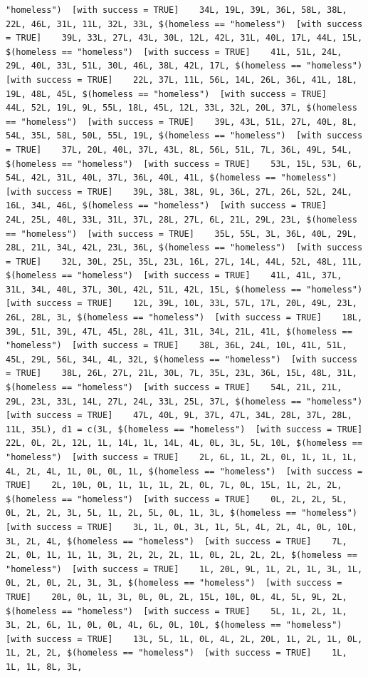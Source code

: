 \documentclass{tufte-book}\usepackage[]{graphicx}\usepackage[]{xcolor}
\makeatletter
\newenvironment{kframe}{%
 \def\at@end@of@kframe{}%
 \ifinner\ifhmode%
  \def\at@end@of@kframe{\end{minipage}}%
  \begin{minipage}{\columnwidth}%
 \fi\fi%
 \def\FrameCommand##1{\hskip\@totalleftmargin \hskip-\fboxsep
 \colorbox{shadecolor}{##1}\hskip-\fboxsep
     \hskip-\linewidth \hskip-\@totalleftmargin \hskip\columnwidth}%
 \MakeFramed {\advance\hsize-\width
   \@totalleftmargin\z@ \linewidth\hsize
   \@setminipage}}%
 {\par\unskip\endMakeFramed%
 \at@end@of@kframe}
\newenvironment{knitrout}{}{} %
\makeatother
\begin{document}
\begin{knitrout}
\begin{kframe}
\begin{verbatim}
"homeless")  [with success = TRUE]    34L, 19L, 39L, 36L, 58L, 38L, 22L, 46L, 31L, 11L, 32L, 33L, $(homeless == "homeless")  [with success = TRUE]    39L, 33L, 27L, 43L, 30L, 12L, 42L, 31L, 40L, 17L, 44L, 15L, $(homeless == "homeless")  [with success = TRUE]    41L, 51L, 24L, 29L, 40L, 33L, 51L, 30L, 46L, 38L, 42L, 17L, $(homeless == "homeless")  [with success = TRUE]    22L, 37L, 11L, 56L, 14L, 26L, 36L, 41L, 18L, 19L, 48L, 45L, $(homeless == "homeless")  [with success = TRUE]    44L, 52L, 19L, 9L, 55L, 18L, 45L, 12L, 33L, 32L, 20L, 37L, $(homeless == "homeless")  [with success = TRUE]    39L, 43L, 51L, 27L, 40L, 8L, 54L, 35L, 58L, 50L, 55L, 19L, $(homeless == "homeless")  [with success = TRUE]    37L, 20L, 40L, 37L, 43L, 8L, 56L, 51L, 7L, 36L, 49L, 54L, $(homeless == "homeless")  [with success = TRUE]    53L, 15L, 53L, 6L, 54L, 42L, 31L, 40L, 37L, 36L, 40L, 41L, $(homeless == "homeless")  [with success = TRUE]    39L, 38L, 38L, 9L, 36L, 27L, 26L, 52L, 24L, 16L, 34L, 46L, $(homeless == "homeless")  [with success = TRUE]    24L, 25L, 40L, 33L, 31L, 37L, 28L, 27L, 6L, 21L, 29L, 23L, $(homeless == "homeless")  [with success = TRUE]    35L, 55L, 3L, 36L, 40L, 29L, 28L, 21L, 34L, 42L, 23L, 36L, $(homeless == "homeless")  [with success = TRUE]    32L, 30L, 25L, 35L, 23L, 16L, 27L, 14L, 44L, 52L, 48L, 11L, $(homeless == "homeless")  [with success = TRUE]    41L, 41L, 37L, 31L, 34L, 40L, 37L, 30L, 42L, 51L, 42L, 15L, $(homeless == "homeless")  [with success = TRUE]    12L, 39L, 10L, 33L, 57L, 17L, 20L, 49L, 23L, 26L, 28L, 3L, $(homeless == "homeless")  [with success = TRUE]    18L, 39L, 51L, 39L, 47L, 45L, 28L, 41L, 31L, 34L, 21L, 41L, $(homeless == "homeless")  [with success = TRUE]    38L, 36L, 24L, 10L, 41L, 51L, 45L, 29L, 56L, 34L, 4L, 32L, $(homeless == "homeless")  [with success = TRUE]    38L, 26L, 27L, 21L, 30L, 7L, 35L, 23L, 36L, 15L, 48L, 31L, $(homeless == "homeless")  [with success = TRUE]    54L, 21L, 21L, 29L, 23L, 33L, 14L, 27L, 24L, 33L, 25L, 37L, $(homeless == "homeless")  [with success = TRUE]    47L, 40L, 9L, 37L, 47L, 34L, 28L, 37L, 28L, 11L, 35L), d1 = c(3L, $(homeless == "homeless")  [with success = TRUE]    22L, 0L, 2L, 12L, 1L, 14L, 1L, 14L, 4L, 0L, 3L, 5L, 10L, $(homeless == "homeless")  [with success = TRUE]    2L, 6L, 1L, 2L, 0L, 1L, 1L, 1L, 4L, 2L, 4L, 1L, 0L, 0L, 1L, $(homeless == "homeless")  [with success = TRUE]    2L, 10L, 0L, 1L, 1L, 1L, 2L, 0L, 7L, 0L, 15L, 1L, 2L, 2L, $(homeless == "homeless")  [with success = TRUE]    0L, 2L, 2L, 5L, 0L, 2L, 2L, 3L, 5L, 1L, 2L, 5L, 0L, 1L, 3L, $(homeless == "homeless")  [with success = TRUE]    3L, 1L, 0L, 3L, 1L, 5L, 4L, 2L, 4L, 0L, 10L, 3L, 2L, 4L, $(homeless == "homeless")  [with success = TRUE]    7L, 2L, 0L, 1L, 1L, 1L, 3L, 2L, 2L, 2L, 1L, 0L, 2L, 2L, 2L, $(homeless == "homeless")  [with success = TRUE]    1L, 20L, 9L, 1L, 2L, 1L, 3L, 1L, 0L, 2L, 0L, 2L, 3L, 3L, $(homeless == "homeless")  [with success = TRUE]    20L, 0L, 1L, 3L, 0L, 0L, 2L, 15L, 10L, 0L, 4L, 5L, 9L, 2L, $(homeless == "homeless")  [with success = TRUE]    5L, 1L, 2L, 1L, 3L, 2L, 6L, 1L, 0L, 0L, 4L, 6L, 0L, 10L, $(homeless == "homeless")  [with success = TRUE]    13L, 5L, 1L, 0L, 4L, 2L, 20L, 1L, 2L, 1L, 0L, 1L, 2L, 2L, $(homeless == "homeless")  [with success = TRUE]    1L, 1L, 1L, 8L, 3L, 
\end{verbatim}
\end{kframe}
\end{knitrout}
\end{document}
